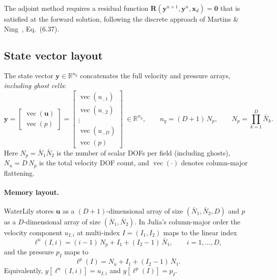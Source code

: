 \documentclass[11pt]{article}
\newcommand{\vect}[1]{\bm{#1}}
\begin{document}
The adjoint method requires a residual function
$\vect{R}(\vect{y}^{n+1}, \vect{y}^{n}, \vect{x}_d)=\vect{0}$
that is satisfied at the forward solution, following the discrete approach
of Martins \& Ning~\cite{Martins2021}, Eq.~(6.37).

\subsection{State vector layout}

The state vector $\vect{y}\in\mathbb{R}^{n_y}$ concatenates the full
velocity and pressure arrays, \emph{including ghost cells}:
\begin{equation}\label{eq:state_vec}
  \vect{y}
  = \begin{bmatrix} \operatorname{vec}(\vect{u}) \\ \operatorname{vec}(p) \end{bmatrix}
  = \begin{bmatrix}
      \operatorname{vec}(u_{\cdot,1}) \\[2pt]
      \operatorname{vec}(u_{\cdot,2}) \\[2pt]
      \vdots \\[2pt]
      \operatorname{vec}(u_{\cdot,D}) \\[2pt]
      \operatorname{vec}(p)
    \end{bmatrix}
  \;\in\mathbb{R}^{n_y},
  \qquad
  n_y = (D+1)\,N_p,
  \qquad
  N_p = \prod_{k=1}^{D}\bar N_k.
\end{equation}
Here $N_p=\bar N_1 \bar N_2$ is the number of scalar DOFs per field
(including ghosts), $N_u = D\,N_p$ is the total velocity DOF count,
and $\operatorname{vec}(\cdot)$ denotes column-major flattening.

\paragraph{Memory layout.}
WaterLily stores $\vect{u}$ as a $(D{+}1)$-dimensional array of size
$(\bar N_1, \bar N_2, D)$ and $p$ as a $D$-dimensional array of size
$(\bar N_1, \bar N_2)$.  In Julia's column-major order the velocity
component $u_{I,i}$ at multi-index $I=(I_1,I_2)$ maps to the linear
index
\begin{equation}\label{eq:lin_vel}
  \ell^{u}(I, i) = (i-1)\,N_p + I_1 + (I_2-1)\,\bar N_1,
  \qquad i=1,\ldots,D,
\end{equation}
and the pressure $p_I$ maps to
\begin{equation}\label{eq:lin_prs}
  \ell^{p}(I) = N_u + I_1 + (I_2-1)\,\bar N_1.
\end{equation}
Equivalently, $y[\ell^{u}(I,i)] = u_{I,i}$ and $y[\ell^{p}(I)] = p_I$.
\end{document}
